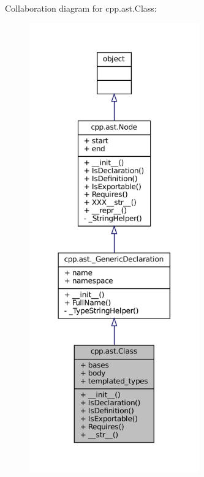 Collaboration diagram for cpp.\+ast.\+Class\+:
\nopagebreak
\begin{figure}[H]
\begin{center}
\leavevmode
\includegraphics[height=550pt]{classcpp_1_1ast_1_1Class__coll__graph}
\end{center}
\end{figure}
